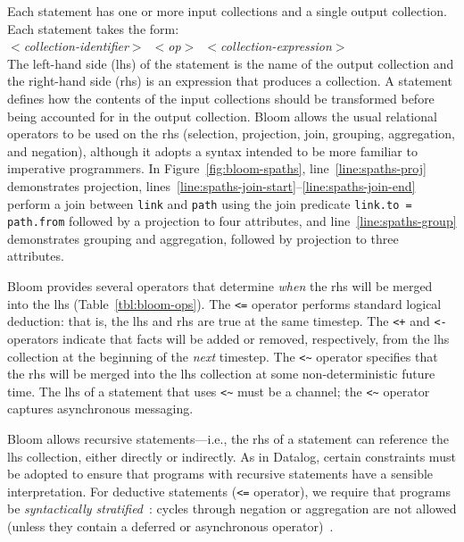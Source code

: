 Each statement has one or more input collections and a single output
collection.  Each statement takes the form: \\ \noindent
\mbox{\hspace{0.25in}\emph{$<$collection-identifier$>$ $<$op$>$
    $<$collection-expression$>$}}\\ \noindent
The left-hand side (lhs) of the statement is the name of the output collection
and the right-hand side (rhs) is an expression that produces a collection.
A statement defines how the contents of the input collections should
be transformed before being accounted for in the output
collection. Bloom
allows the usual relational operators to be used on the rhs (selection,
projection, join, grouping, aggregation, and negation), although it adopts a
syntax intended to be more familiar to imperative programmers. In
Figure~\ref{fig:bloom-spaths}, line~\ref{line:spaths-proj} demonstrates projection,
lines~\ref{line:spaths-join-start}--\ref{line:spaths-join-end} perform a join
between \texttt{link} and \texttt{path} using the join predicate
\verb+link.to = path.from+ followed by a projection to four attributes, and line~\ref{line:spaths-group} demonstrates
grouping and aggregation, followed by projection to three attributes.

Bloom provides several operators that determine \emph{when} the rhs will be
merged into the lhs (Table~\ref{tbl:bloom-ops}). The \verb|<=| operator performs
standard logical deduction: that is, the lhs and rhs are true at the same
timestep. The \verb|<+| and \verb|<-| operators indicate that facts will be
added or removed, respectively, from the lhs collection at the beginning of the
{\em next} timestep. The \verb+<~+ operator specifies that the rhs will be merged into
the lhs collection at some non-deterministic future time. The lhs of a statement
that uses \verb+<~+ must be a channel; the \verb+<~+ operator captures
asynchronous messaging.

Bloom allows recursive statements---i.e., the rhs of a statement can reference
the lhs collection, either directly or indirectly. As in Datalog, certain
constraints must be adopted to ensure that programs with recursive statements
have a sensible interpretation. For deductive statements (\verb+<=+ operator),
we require that programs be \emph{syntactically stratified}~\cite{Apt1988}:
cycles through negation or aggregation are not allowed (unless they contain a deferred or asynchronous operator)~\cite{dedalus}.

